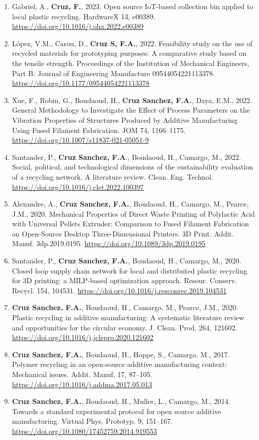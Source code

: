 \documentclass[
  11pt,
]{article}
\begin{document}
\begin{enumerate}
\def\labelenumi{\arabic{enumi}.}
\item
  Gabriel, A., \textbf{Cruz, F.}, 2023. Open source IoT-based collection
  bin applied to local plastic recycling. HardwareX 13, e00389.
  \url{https://doi.org/10.1016/j.ohx.2022.e00389}
\item
  López, V.M., Carou, D., \textbf{Cruz S, F.A.}, 2022. Feasibility study
  on the use of recycled materials for prototyping purposes: A
  comparative study based on the tensile strength. Proceedings of the
  Institution of Mechanical Engineers, Part B: Journal of Engineering
  Manufacture 09544054221113378.
  \url{https://doi.org/10.1177/09544054221113378}
\item
  Xue, F., Robin, G., Boudaoud, H., \textbf{Cruz Sanchez, F.A.}, Daya,
  E.M., 2022. General Methodology to Investigate the Effect of Process
  Parameters on the Vibration Properties of Structures Produced by
  Additive Manufacturing Using Fused Filament Fabrication. JOM 74,
  1166--1175. \url{https://doi.org/10.1007/s11837-021-05051-9}
\item
  Santander, P., \textbf{Cruz Sanchez, F.A}., Boudaoud, H., Camargo, M.,
  2022. Social, political, and technological dimensions of the
  sustainability evaluation of a recycling network. A literature review.
  Clean. Eng. Technol. \url{https://doi.org/10.1016/j.clet.2022.100397}
\item
  Alexandre, A., \textbf{Cruz Sanchez, F.A.}, Boudaoud, H., Camargo, M.,
  Pearce, J.M., 2020. Mechanical Properties of Direct Waste Printing of
  Polylactic Acid with Universal Pellets Extruder: Comparison to Fused
  Filament Fabrication on Open-Source Desktop Three-Dimensional
  Printers. 3D Print. Addit. Manuf. 3dp.2019.0195.
  \url{https://doi.org/10.1089/3dp.2019.0195}
\item
  Santander, P., \textbf{Cruz Sanchez, F.A.}, Boudaoud, H., Camargo, M.,
  2020. Closed loop supply chain network for local and distributed
  plastic recycling for 3D printing: a MILP-based optimization approach.
  Resour. Conserv. Recycl. 154, 104531.
  \url{https://doi.org/10.1016/j.resconrec.2019.104531}
\item
  \textbf{Cruz Sanchez, F.A.}, Boudaoud, H., Camargo, M., Pearce, J.M.,
  2020. Plastic recycling in additive manufacturing: A systematic
  literature review and opportunities for the circular economy. J.
  Clean. Prod. 264, 121602.
  \url{https://doi.org/10.1016/j.jclepro.2020.121602}
\item
  \textbf{Cruz Sanchez, F.A.}, Boudaoud, H., Hoppe, S., Camargo, M.,
  2017. Polymer recycling in an open-source additive manufacturing
  context: Mechanical issues. Addit. Manuf. 17, 87--105.
  \url{https://doi.org/10.1016/j.addma.2017.05.013}
\item
  \textbf{Cruz Sanchez, F.A.}, Boudaoud, H., Muller, L., Camargo, M.,
  2014. Towards a standard experimental protocol for open source
  additive manufacturing. Virtual Phys. Prototyp. 9, 151--167.
  \url{https://doi.org/10.1080/17452759.2014.919553}
\end{enumerate}
\end{document}
